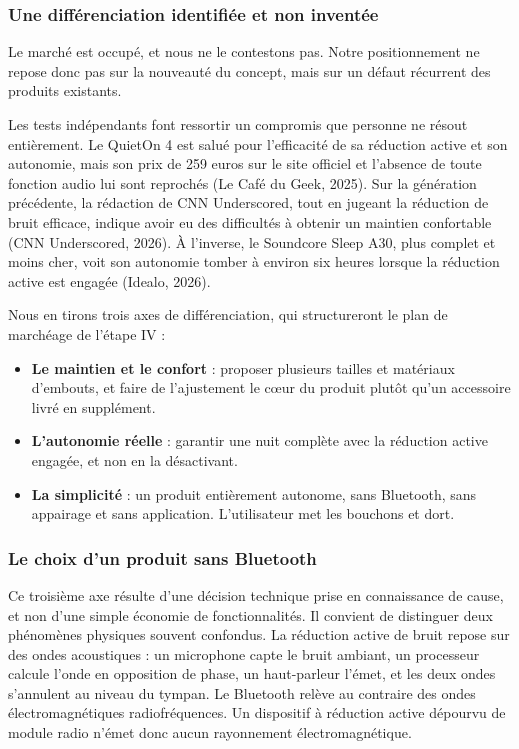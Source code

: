 \subsubsection{Une différenciation identifiée et non inventée}

Le marché est occupé, et nous ne le contestons pas. Notre positionnement ne
repose donc pas sur la nouveauté du concept, mais sur un défaut récurrent des
produits existants.

Les tests indépendants font ressortir un compromis que personne ne résout
entièrement. Le QuietOn 4 est salué pour l'efficacité de sa réduction active et
son autonomie, mais son prix de 259 euros sur le site officiel et l'absence de
toute fonction audio lui sont reprochés (Le Café du Geek, 2025). Sur la génération précédente, la
rédaction de CNN Underscored, tout en jugeant la réduction de bruit efficace,
indique avoir eu des difficultés à obtenir un maintien confortable
(CNN Underscored, 2026). À l'inverse,
le Soundcore Sleep A30, plus complet et moins cher, voit son autonomie tomber à
environ six heures lorsque la réduction active est engagée (Idealo, 2026).

Nous en tirons trois axes de différenciation, qui structureront le plan de
marchéage de l'étape IV :

\begin{itemize}
  \item \textbf{Le maintien et le confort} : proposer plusieurs tailles et
        matériaux d'embouts, et faire de l'ajustement le c\oe{}ur du produit
        plutôt qu'un accessoire livré en supplément.
  \item \textbf{L'autonomie réelle} : garantir une nuit complète avec la
        réduction active engagée, et non en la désactivant.
  \item \textbf{La simplicité} : un produit entièrement autonome, sans
        Bluetooth, sans appairage et sans application. L'utilisateur met les
        bouchons et dort.
\end{itemize}

\subsubsection{Le choix d'un produit sans Bluetooth}

Ce troisième axe résulte d'une décision technique prise en connaissance de
cause, et non d'une simple économie de fonctionnalités. Il convient de
distinguer deux phénomènes physiques souvent confondus. La réduction active de
bruit repose sur des ondes acoustiques : un microphone capte le bruit ambiant,
un processeur calcule l'onde en opposition de phase, un haut-parleur l'émet, et
les deux ondes s'annulent au niveau du tympan. Le Bluetooth relève au contraire
des ondes électromagnétiques radiofréquences. Un dispositif à réduction active
dépourvu de module radio n'émet donc aucun rayonnement électromagnétique.

